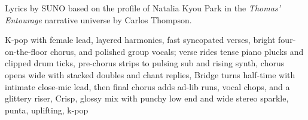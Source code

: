 
\begin{notes}
Lyrics by SUNO based on the profile of Natalia Kyou Park in the \emph{Thomas’ Entourage} narrative universe by Carlos Thompson.
\end{notes}
\begin{style}
K-pop with female lead, layered harmonies, fast syncopated verses, bright four-on-the-floor chorus, and polished group vocals; verse rides tense piano plucks and clipped drum ticks, pre-chorus strips to pulsing sub and rising synth, chorus opens wide with stacked doubles and chant replies, Bridge turns half-time with intimate close-mic lead, then final chorus adds ad-lib runs, vocal chops, and a glittery riser, Crisp, glossy mix with punchy low end and wide stereo sparkle, punta, uplifting, k-pop
\end{style}
